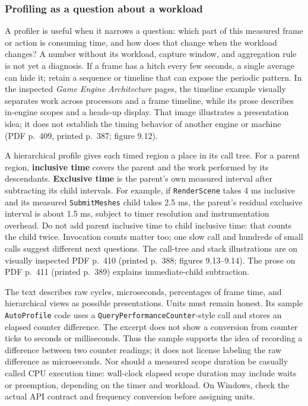 \subsubsection{Profiling as a question about a workload}\label{profiling-as-a-question-about-a-workload}

A profiler is useful when it narrows a question: which part of this measured frame or action is consuming time, and how does that change when the workload changes? A number without its workload, capture window, and aggregation rule is not yet a diagnosis. If a frame has a hitch every few seconds, a single average can hide it; retain a sequence or timeline that can expose the periodic pattern. In the inspected \emph{Game Engine Architecture} pages, the timeline example visually separates work across processors and a frame timeline, while its prose describes in-engine scopes and a heads-up display. That image illustrates a presentation idea; it does not establish the timing behavior of another engine or machine (PDF p.~409, printed p.~387; figure 9.12).

A hierarchical profile gives each timed region a place in its call tree. For a parent region, \textbf{inclusive time} covers the parent and the work performed by its descendants. \textbf{Exclusive time} is the parent's own measured interval after subtracting its child intervals. For example, if \texttt{RenderScene} takes 4 ms inclusive and its measured \texttt{SubmitMeshes} child takes 2.5 ms, the parent's residual exclusive interval is about 1.5 ms, subject to timer resolution and instrumentation overhead. Do not add parent inclusive time to child inclusive time: that counts the child twice. Invocation counts matter too; one slow call and hundreds of small calls suggest different next questions. The call-tree and stack illustrations are on visually inspected PDF p.~410 (printed p.~388; figures 9.13--9.14). The prose on PDF p.~411 (printed p.~389) explains immediate-child subtraction.

The text describes raw cycles, microseconds, percentages of frame time, and hierarchical views as possible presentations. Units must remain honest. Its sample \texttt{AutoProfile} code uses a \texttt{QueryPerformanceCounter}-style call and stores an elapsed counter difference. The excerpt does not show a conversion from counter ticks to seconds or milliseconds. Thus the sample supports the idea of recording a difference between two counter readings; it does not license labeling the raw difference as microseconds. Nor should a measured scope duration be casually called CPU execution time: wall-clock elapsed scope duration may include waits or preemption, depending on the timer and workload. On Windows, check the actual API contract and frequency conversion before assigning units.


